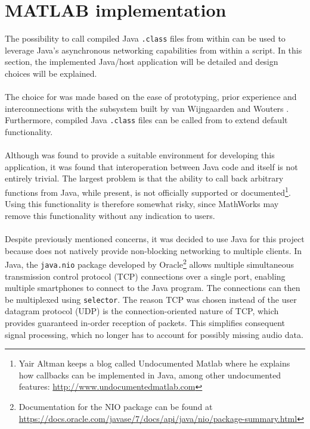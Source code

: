 \documentclass[a4paper, notitlepage]{report}
\begin{document}
\section{MATLAB implementation}
\label{sec:matlab}
The possibility to call compiled Java \texttt{.class} files from within \matlab can be used to leverage Java's asynchronous networking capabilities from within a \matlab script. In this section, the implemented Java/\matlab host application will be detailed and design choices will be explained.

\paragraph*{}
The choice for \matlab was made based on the ease of prototyping, prior experience and interconnections with the subsystem built by van Wijngaarden and Wouters \cite{BAP:ErikNiels}. Furthermore, compiled Java \texttt{.class} files can be called from \matlab to extend default \matlab functionality.

\paragraph*{}
Although \matlab was found to provide a suitable environment for developing this application, it was found that interoperation between Java code and \matlab itself is not entirely trivial. The largest problem is that the ability to call back arbitrary \matlab functions from Java, while present, is not officially supported or documented\footnote{Yair Altman keeps a blog called Undocumented Matlab where he explains how \matlab callbacks can be implemented in Java, among other undocumented features: \url{http://www.undocumentedmatlab.com}}. Using this functionality is therefore somewhat risky, since MathWorks may remove this functionality without any indication to users.

\paragraph*{}
Despite previously mentioned concerns, it was decided to use Java for this project because \matlab does not natively provide non-blocking networking to multiple clients. In Java, the \texttt{java.nio} package developed by Oracle\footnote{Documentation for the NIO package can be found at \\ \url{https://docs.oracle.com/javase/7/docs/api/java/nio/package-summary.html}} allows multiple simultaneous transmission control protocol (TCP) connections over a single port, enabling multiple smartphones to connect to the Java program. The connections can then be multiplexed using \texttt{selector}. The reason TCP was chosen instead of the user datagram protocol (UDP) is the connection-oriented nature of TCP, which provides guaranteed in-order reception of packets. This simplifies consequent signal processing, which no longer has to account for possibly missing audio data.
\end{document}
